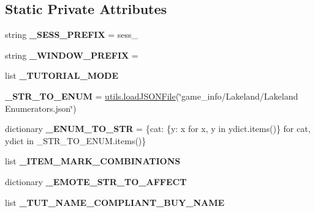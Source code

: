 \subsection*{Static Private Attributes}
\begin{DoxyCompactItemize}
\item 
\mbox{\label{classfeature__extractors_1_1_lakeland_extractor_1_1_lakeland_extractor_a8372a5ddfd85fbee502d1f93d569f64b}} 
string {\bfseries \+\_\+\+S\+E\+S\+S\+\_\+\+P\+R\+E\+F\+IX} = \textquotesingle{}sess\+\_\+\textquotesingle{}
\item 
\mbox{\label{classfeature__extractors_1_1_lakeland_extractor_1_1_lakeland_extractor_a607d6896df201d0858869874ebfd9496}} 
string {\bfseries \+\_\+\+W\+I\+N\+D\+O\+W\+\_\+\+P\+R\+E\+F\+IX} = \textquotesingle{}\textquotesingle{}
\item 
list {\bfseries \+\_\+\+T\+U\+T\+O\+R\+I\+A\+L\+\_\+\+M\+O\+DE}
\item 
\mbox{\label{classfeature__extractors_1_1_lakeland_extractor_1_1_lakeland_extractor_a6d49ad733b2f9f35a2563fb2be71017f}} 
{\bfseries \+\_\+\+S\+T\+R\+\_\+\+T\+O\+\_\+\+E\+N\+UM} = \mbox{\hyperlink{namespaceutils_a05bb98273ce91cd5c7922286b703596f}{utils.\+load\+J\+S\+O\+N\+File}}(\char`\"{}game\+\_\+info/Lakeland/Lakeland Enumerators.\+json\char`\"{})
\item 
\mbox{\label{classfeature__extractors_1_1_lakeland_extractor_1_1_lakeland_extractor_a5a70f5ecf7f2e603ef4a0ef1c00ad526}} 
dictionary {\bfseries \+\_\+\+E\+N\+U\+M\+\_\+\+T\+O\+\_\+\+S\+TR} = \{cat\+: \{y\+: x for x, y in ydict.\+items()\} for cat, ydict in \+\_\+\+S\+T\+R\+\_\+\+T\+O\+\_\+\+E\+N\+U\+M.\+items()\}
\item 
list {\bfseries \+\_\+\+I\+T\+E\+M\+\_\+\+M\+A\+R\+K\+\_\+\+C\+O\+M\+B\+I\+N\+A\+T\+I\+O\+NS}
\item 
dictionary {\bfseries \+\_\+\+E\+M\+O\+T\+E\+\_\+\+S\+T\+R\+\_\+\+T\+O\+\_\+\+A\+F\+F\+E\+CT}
\item 
list {\bfseries \+\_\+\+T\+U\+T\+\_\+\+N\+A\+M\+E\+\_\+\+C\+O\+M\+P\+L\+I\+A\+N\+T\+\_\+\+B\+U\+Y\+\_\+\+N\+A\+ME}

\end{DoxyCompactItemize}
